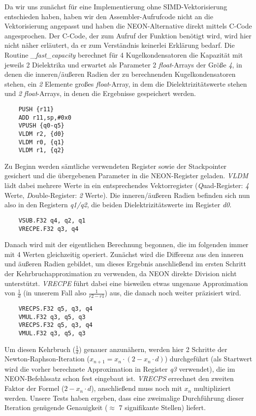 \documentclass[11pt]{scrartcl}
\begin{document}
Da wir uns zunächst für eine Implementierung ohne SIMD-Vektorisierung entschieden haben, haben wir den Assembler-Aufrufcode nicht an die Vektorisierung angepasst und haben die NEON-Alternative direkt mittels C-Code angesprochen. Der C-Code, der zum Aufruf der Funktion benötigt wird, wird hier nicht näher erläutert, da er zum Verständnis keinerlei Erklärung bedarf. Die Routine \emph{\_fast\_capacity} berechnet für 4 Kugelkondensatoren die Kapazität mit jeweils 2 Dielektrika und erwartet als Parameter 2 \emph{float}-Arrays der Größe \emph{4}, in denen die inneren/äußeren Radien der zu berechnenden Kugelkondensatoren stehen, ein \emph{2} Elemente großes \emph{float}-Array, in dem die Dielektrizitätswerte stehen und \emph{2} \emph{float}-Arrays, in denen die Ergebnisse gespeichert werden.
\begin{verbatim}
	PUSH {r11}
	ADD r11,sp,#0x0
	VPUSH {q0-q5}
	VLDM r2, {d0}
	VLDM r0, {q1}
	VLDM r1, {q2}
\end{verbatim}
Zu Beginn werden sämtliche verwendeten Register sowie der Stackpointer gesichert und die übergebenen Parameter in die NEON-Register geladen. \emph{VLDM} lädt dabei mehrere Werte in ein entsprechendes Vektorregister (\emph{Q}uad-Register: \emph{4} Werte, \emph{D}ouble-Register: \emph{2} Werte). Die inneren/äußeren Radien befinden sich nun also in den Registern \emph{q1/q2}, die beiden Dielektrizitätswerte im Register \emph{d0}.
\begin{verbatim}
	VSUB.F32 q4, q2, q1
	VRECPE.F32 q3, q4
\end{verbatim}
Danach wird mit der eigentlichen Berechnung begonnen, die im folgenden immer mit 4 Werten gleichzeitig operiert. Zunächst wird die Differenz aus den inneren und äußeren Radien gebildet, um dieses Ergebnis anschließend im ersten Schritt der Kehrbruchapproximation zu verwenden, da NEON direkte Division nicht unterstützt. \emph{VRECPE} führt dabei eine bisweilen etwas ungenaue Approximation von $\frac{1}{d}$ (in unserem Fall also $\frac{1}{r2-r1}$) aus, die danach noch weiter präzisiert wird.
\begin{verbatim}
	VRECPS.F32 q5, q3, q4
	VMUL.F32 q3, q5, q3
	VRECPS.F32 q5, q3, q4
	VMUL.F32 q3, q5, q3
\end{verbatim}
Um diesen Kehrbruch ($\frac{1}{d}$) genauer anzunähern, werden hier 2 Schritte der Newton-Raphson-Iteration ($x_{n+1}=x_{n} \cdot (2 - x_{n} \cdot d)$) durchgeführt (als Startwert wird die vorher berechnete Approximation in Register \emph{q3} verwendet), die im NEON-Befehlssatz schon fest eingebaut ist. \emph{VRECPS} errechnet den zweiten Faktor der Formel ($2 - x_{n} \cdot d$), anschließend muss noch mit $x_{n}$ multipliziert werden. Unsere Tests haben ergeben, dass eine zweimalige Durchführung dieser Iteration genügende Genauigkeit ($\approx$ 7 signifikante Stellen) liefert.
\end{document}
